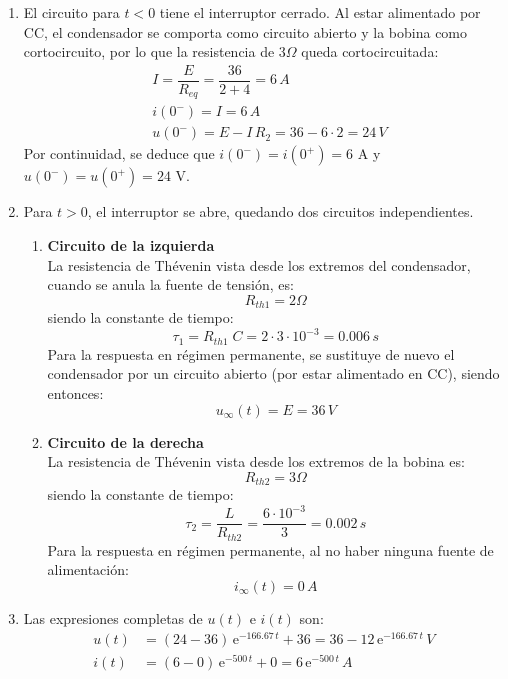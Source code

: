 \begin{enumerate}
    \item El circuito para $t<0$ tiene el interruptor cerrado. Al estar alimentado por CC, el condensador se comporta como circuito abierto y la bobina como cortocircuito, por lo que la resistencia de $3\Omega$ queda cortocircuitada:
    \begin{align*}
        &I=\dfrac{E}{R_{eq}}=\dfrac{36}{2+4}=6\,A\\
        &i(0^-)=I=6\,A\\
        &u(0^-)=E-I\,R_2=36-6\cdot 2=24\,V
    \end{align*}
    Por continuidad, se deduce que $i(0^-)=i(0^+)=6$ A y $u(0^-)=u(0^+)=24$ V.
    \item Para $t>0$, el interruptor se abre, quedando dos circuitos independientes. 
    \begin{enumerate}
        \item \textbf{Circuito de la izquierda}\\
        La resistencia de Thévenin vista desde los extremos del condensador, cuando se anula la fuente de tensión, es:
    \begin{equation*}
        R_{th1}=2\Omega
    \end{equation*}
    siendo la constante de tiempo:
    \begin{equation*}
        \tau_1=R_{th1}\;C=2\cdot 3\cdot10^{-3}=0.006\,s
    \end{equation*}
    Para la respuesta en régimen permanente, se sustituye de nuevo el condensador por un circuito abierto (por estar alimentado en CC), siendo entonces:
    \begin{equation*}
        u_{\infty}(t)=E=36\,V
    \end{equation*}
    \item \textbf{Circuito de la derecha}\\
        La resistencia de Thévenin vista desde los extremos de la bobina es:
    \begin{equation*}
        R_{th2}=3\Omega
    \end{equation*}
    siendo la constante de tiempo:
    \begin{equation*}
        \tau_2=\dfrac{L}{R_{th2}}=\dfrac{6\cdot 10^{-3}}{3}=0.002\,s
    \end{equation*}
    Para la respuesta en régimen permanente, al no haber ninguna fuente de alimentación:
    \begin{equation*}
        i_{\infty}(t)=0\,A
    \end{equation*}
    \end{enumerate}
    \item Las expresiones completas de $u(t)$ e $i(t)$ son:
    \begin{align*}
        u(t)&=\left(24-36 \right)\,\mathrm{e}^{-166.67\,t}+36=36-12\,\mathrm{e}^{-166.67\,t}\,V\\
        i(t)&=\left(6-0 \right)\,\mathrm{e}^{-500\,t}+0=6\,\mathrm{e}^{-500\,t}\,A
    \end{align*}
\end{enumerate}


